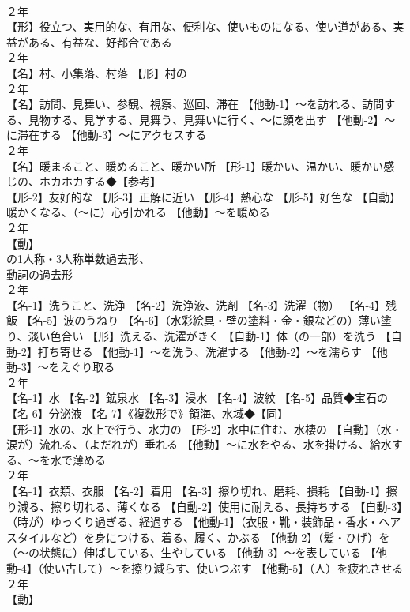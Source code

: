 \documentclass[8pt]{extreport}
\begin{document}
\begin{CJK}{UTF8}{min}
\\	２年	
\\	【形】役立つ、実用的な、有用な、便利な、使いものになる、使い道がある、実益がある、有益な、好都合である
\\	２年	
\\	【名】村、小集落、村落 【形】村の
\\	２年	
\\	【名】訪問、見舞い、参観、視察、巡回、滞在 【他動-1】～を訪れる、訪問する、見物する、見学する、見舞う、見舞いに行く、～に顔を出す 【他動-2】～に滞在する 【他動-3】～にアクセスする
\\	２年	
\\	【名】暖まること、暖めること、暖かい所 【形-1】暖かい、温かい、暖かい感じの、ホカホカする◆【参考】
\\	【形-2】友好的な 【形-3】正解に近い 【形-4】熱心な 【形-5】好色な 【自動】暖かくなる、（～に）心引かれる 【他動】～を暖める
\\	２年	
\\	【動】
\\	の1人称・3人称単数過去形、
\\	動詞の過去形
\\	２年	
\\	【名-1】洗うこと、洗浄 【名-2】洗浄液、洗剤 【名-3】洗濯（物） 【名-4】残飯 【名-5】波のうねり 【名-6】（水彩絵具・壁の塗料・金・銀などの）薄い塗り、淡い色合い 【形】洗える、洗濯がきく 【自動-1】体（の一部）を洗う 【自動-2】打ち寄せる 【他動-1】～を洗う、洗濯する 【他動-2】～を濡らす 【他動-3】～をえぐり取る
\\	２年	
\\	【名-1】水 【名-2】鉱泉水 【名-3】浸水 【名-4】波紋 【名-5】品質◆宝石の 【名-6】分泌液 【名-7】《複数形で》領海、水域◆【同】
\\	【形-1】水の、水上で行う、水力の 【形-2】水中に住む、水棲の 【自動】（水・涙が）流れる、（よだれが）垂れる 【他動】～に水をやる、水を掛ける、給水する、～を水で薄める
\\	２年	
\\	【名-1】衣類、衣服 【名-2】着用 【名-3】擦り切れ、磨耗、損耗 【自動-1】擦り減る、擦り切れる、薄くなる 【自動-2】使用に耐える、長持ちする 【自動-3】（時が）ゆっくり過ぎる、経過する 【他動-1】（衣服・靴・装飾品・香水・ヘアスタイルなど）を身につける、着る、履く、かぶる 【他動-2】（髪・ひげ）を（～の状態に）伸ばしている、生やしている 【他動-3】～を表している 【他動-4】（使い古して）～を擦り減らす、使いつぶす 【他動-5】（人）を疲れさせる
\\	２年	
\\	【動】

\end{CJK}
\end{document}
